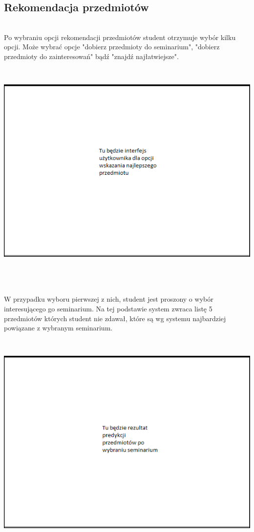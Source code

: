 \documentclass[licencjacka]{pracamgr}
\begin{document}
\subsection{Rekomendacja przedmiotów} ~\\ \indent
Po wybraniu opcji rekomendacji przedmiotów student otrzymuje wybór kilku opcji. Może wybrać opcje "dobierz przedmioty do seminarium", "dobierz przedmioty do zainteresowań" bądź "znajdź najłatwiejsze". \par
 ~\\
\begin{minipage}{\linewidth}
	\centering
           \includegraphics[scale=0.7]{bestprzed.png}
\end{minipage} \\  \\ \\
\indent W przypadku wyboru pierwszej z nich, student jest proszony o wybór interesującego go seminarium. Na tej podstawie system zwraca listę 5 przedmiotów których student nie zdawał, które są wg systemu najbardziej powiązane z wybranym seminarium. \par
 ~\\
\begin{minipage}{\linewidth}
	\centering
           \includegraphics[scale=0.7]{bestprzedsem.png}
\end{minipage} \\ 
\end{document}
